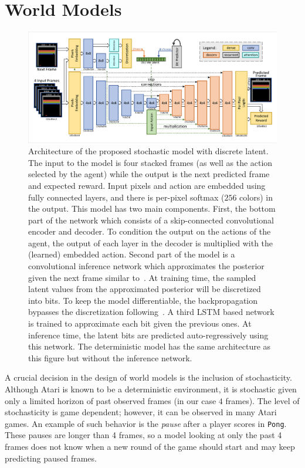 \section{World Models}
\label{sec:world_models}
\label{sec:architectures}
\label{sec:training}

\begin{figure}[t]
\centering
\includegraphics[width=1.0\textwidth]{figures/model_basic_disc.pdf}
\caption{Architecture of the proposed stochastic model with discrete latent. The input to the model is four stacked frames (as well as the action selected by the agent) while the output is the next predicted frame and expected reward. Input pixels and action are embedded using fully connected layers, and there is per-pixel softmax ($256$ colors) in the output. This model has two main components. First, the bottom part of the network which consists of a skip-connected convolutional encoder and decoder. To condition the output on the actions of the agent, the output of each layer in the decoder is multiplied with the (learned) embedded action. Second part of the model is a convolutional inference network which approximates the posterior given the next frame similar to~\citet{sv2p}. At training time, the sampled latent values from the approximated posterior will be discretized into bits. To keep the model differentiable, the backpropagation bypasses the discretization following~\citet{auto_discrete}. A third LSTM based network is trained to approximate each bit given the previous ones. At inference time, the latent bits are predicted auto-regressively using this network. The deterministic model has the same architecture as this figure but without the inference network.} 
\label{fig:full_discrete}
\end{figure}




A crucial decision in the design of world models   %
is the inclusion of stochasticity. Although Atari is known to be a deterministic environment, it is stochastic given only a limited horizon of past observed frames (in our case $4$ frames). The level of stochasticity is game dependent; however, it can be observed in many Atari games. An example of such behavior is the \textit{pause} after a player scores in \texttt{Pong}. These pauses are longer than 4 frames, so a model looking at only the past 4 frames does not know when a new round of the game should start and may keep predicting paused frames.

